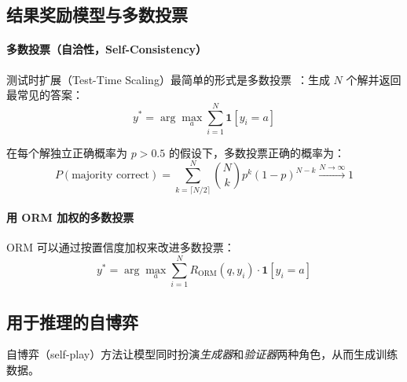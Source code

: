 \subsection{结果奖励模型与多数投票}
\label{outcome-reward-models-and-majority-voting}

\paragraph{多数投票（自洽性，Self-Consistency）}
\label{majority-voting-self-consistency}

测试时扩展（Test-Time Scaling）最简单的形式是多数投票~\cite{wang2023selfconsistency}：生成 $N$ 个解并返回最常见的答案：
\begin{equation}
    y^* = \arg\max_{a} \sum_{i=1}^{N} \mathbf{1}[y_i = a]
\end{equation}

在每个解独立正确概率为 $p > 0.5$ 的假设下，多数投票正确的概率为：
\begin{equation}
    P(\text{majority correct}) = \sum_{k=\lceil N/2 \rceil}^{N} \binom{N}{k} p^k (1-p)^{N-k} \xrightarrow{N \to \infty} 1
\end{equation}

\paragraph{用 ORM 加权的多数投票}
\label{weighted-majority-voting-with-orm}

ORM 可以通过按置信度加权来改进多数投票：
\begin{equation}
    y^* = \arg\max_{a} \sum_{i=1}^{N} R_{\text{ORM}}(q, y_i) \cdot \mathbf{1}[y_i = a]
\end{equation}

\subsection{用于推理的自博弈}
\label{self-play-for-reasoning}

自博弈（self-play）方法让模型同时扮演\emph{生成器}和\emph{验证器}两种角色，从而生成训练数据。

